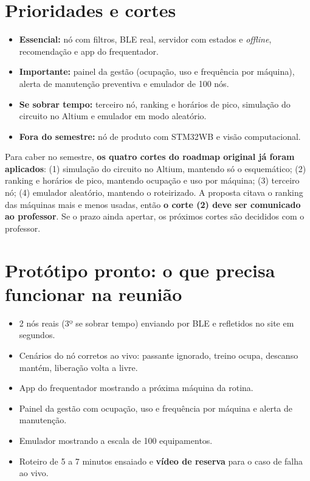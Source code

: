 \documentclass[11pt,a4paper]{article}
\begin{document}
\section{Prioridades e cortes}\label{sec:cortes}

\begin{itemize}
  \item \textbf{Essencial:} nó com filtros, BLE real, servidor com estados e \emph{offline}, recomendação e app do frequentador.
  \item \textbf{Importante:} painel da gestão (ocupação, uso e frequência por máquina), alerta de manutenção preventiva e emulador de 100 nós.
  \item \textbf{Se sobrar tempo:} terceiro nó, ranking e horários de pico, simulação do circuito no Altium e emulador em modo aleatório.
  \item \textbf{Fora do semestre:} nó de produto com STM32WB e visão computacional.
\end{itemize}

Para caber no semestre, \textbf{os quatro cortes do roadmap original já foram aplicados}: (1) simulação do circuito no Altium, mantendo só o esquemático; (2) ranking e horários de pico, mantendo ocupação e uso por máquina; (3) terceiro nó; (4) emulador aleatório, mantendo o roteirizado. A proposta citava o ranking das máquinas mais e menos usadas, então \textbf{o corte (2) deve ser comunicado ao professor}. Se o prazo ainda apertar, os próximos cortes são decididos com o professor.

\section{Protótipo pronto: o que precisa funcionar na reunião}

\begin{itemize}
  \item 2 nós reais (3º se sobrar tempo) enviando por BLE e refletidos no site em segundos.
  \item Cenários do nó corretos ao vivo: passante ignorado, treino ocupa, descanso mantém, liberação volta a livre.
  \item App do frequentador mostrando a próxima máquina da rotina.
  \item Painel da gestão com ocupação, uso e frequência por máquina e alerta de manutenção.
  \item Emulador mostrando a escala de 100 equipamentos.
  \item Roteiro de 5 a 7 minutos ensaiado e \textbf{vídeo de reserva} para o caso de falha ao vivo.
\end{itemize}
\end{document}

